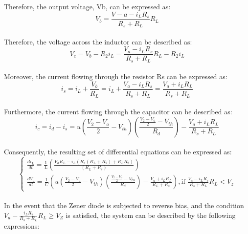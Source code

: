 Therefore, the output voltage, Vb, can be expressed as:\\

\begin{equation}
    V_b=\frac{V-a-i_LR_s}{R_s+R_L}R_L
\end{equation}\\

Therefore, the voltage across the inductor can be described as:\\

\begin{equation}
    V_c=V_b-R_2i_L=\frac{V_a-i_LR_s}{R_s+R_L}R_L-R_2i_L
\end{equation}\\

Moreover, the current flowing through the resistor Rs can be expressed as:\\

\begin{equation}
    i_s=i_L+\frac{V_b}{R_L}=i_L+\frac{V_a-i_LR_s}{R_s+R_L}=\frac{V_a+i_LR_L}{R_s+R_L}
\end{equation}\\

Furthermore, the current flowing through the capacitor can be described as:\\

\begin{equation}
    i_c=i_d-i_s=u(\frac{V_2-V_a}{2}-V_{th})(\frac{\frac{V_2-V_a}{2}-V_{th}}{R_d})-\frac{V_a+i_LR_L}{R_s+R_L}
\end{equation}\\

Consequently, the resulting set of differential equations can be expressed as:\\

\begin{equation}
    \begin{cases}
        \frac{di_L}{dt}=\frac{1}{L}(\frac{V_aR_L-i_L(R_s(R_L+R_2)+R_LR_2)}{(R_L+R_s)})\\
        \frac{dV_a}{dt}=\frac{1}{C}(u(\frac{V_2-V_a}{2}-V_{th})(\frac{\frac{V_2-V_a}{2}-V_{th}}{R_d})-\frac{V_a+i_LR_L}{R_L+R_s}),  \text{if } \frac{V_a-i_LR_s}{R_s+R_L}R_L<V_z
    \end{cases}
\end{equation}\\

In the event that the Zener diode is subjected to reverse bias, and the condition $V_a - \frac{i_L R_s}{R_s+R_L} R_L \geq V_Z$ is satisfied, the system can be described by the following expressions:\\

